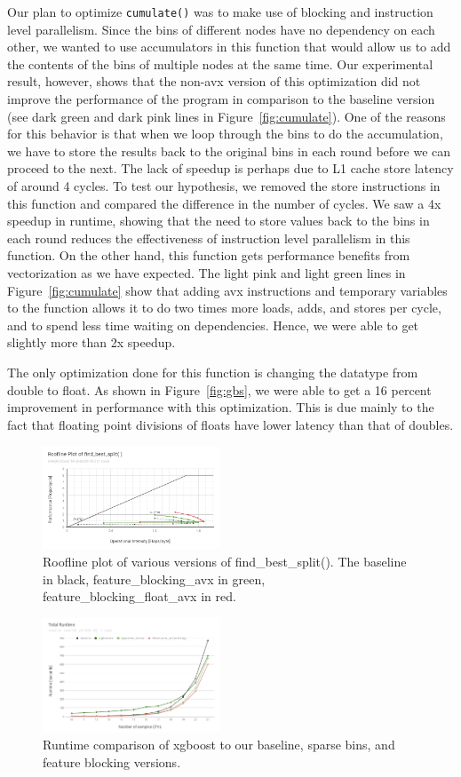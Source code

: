 Our plan to optimize \texttt{cumulate()} was to make use of blocking and instruction level parallelism. Since the bins of different nodes have no dependency on each other, we wanted to use accumulators in this function that would allow us to add the contents of the bins of multiple nodes at the same time. Our experimental result, however, shows that the non-avx version of this optimization did not improve the performance of the program in comparison to the baseline version (see dark green and dark pink lines in Figure~\ref{fig:cumulate}). One of the reasons for this behavior is that when we loop through the bins to do the accumulation, we have to store the results back to the original bins in each round before we can proceed to the next. The lack of speedup is perhaps due to L1 cache store latency of around 4 cycles. To test our hypothesis, we removed the store instructions in this function and compared the difference in the number of cycles. We saw a 4x speedup in runtime, showing that the need to store values back to the bins in each round reduces the effectiveness of instruction level parallelism in this function. On the other hand, this function gets performance benefits from vectorization as we have expected. The light pink and light green lines in Figure~\ref{fig:cumulate} show that adding avx instructions and temporary variables to the function allows it to do two times more loads, adds, and stores per cycle, and to spend less time waiting on dependencies. Hence, we were able to get slightly more than 2x speedup.

The only optimization done for this function is changing the datatype from double to float. As shown in Figure~\ref{fig:gbs}, we were able to get a 16 percent improvement in performance with this optimization. This is due mainly to the fact that floating point divisions of floats have lower latency than that of doubles.

\begin{figure}[h]
  \includegraphics[width=0.47\textwidth]{fig/roofline.png}
  \caption{Roofline plot of various versions of find\_best\_split(). The baseline in black, feature\_blocking\_avx in green, feature\_blocking\_float\_avx in red.}
\end{figure}

\begin{figure}[ht]
  \includegraphics[width=0.47\textwidth]{fig/runtime.png}
  \caption{Runtime comparison of xgboost to our baseline, sparse bins, and feature blocking versions.}
\end{figure}